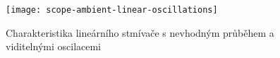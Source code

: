\begin{figure}[htbp]
    \centering
    \texttt{[image: scope-ambient-linear-oscillations]}
    \caption{%
        Charakteristika lineárního stmívače s nevhodným průběhem a viditelnými
        oscilacemi
    }
    \label{fig:ambient linear mereni scope oscilace}
\end{figure}


